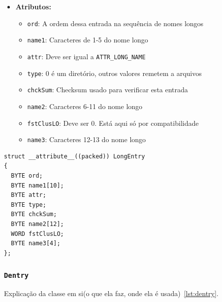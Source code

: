 \documentclass[
    12pt,				%
    oneside,   	        %
    a4paper,			%
    english,			%
    french,				%
    spanish,			%
    brazil,				%
    ]{pacotes/abntex2}
\begin{document}
\begin{itemize}
    \item \textbf{Atributos:}
        \begin{itemize}
            \item \texttt{ord}: A ordem dessa entrada na sequência de nomes longos
            \item \texttt{name1}: Caracteres de 1-5 do nome longo
            \item \texttt{attr}: Deve ser igual a \texttt{ATTR\_LONG\_NAME}
            \item \texttt{type}: 0 é um diretório, outros valores remetem a arquivos
            \item \texttt{chckSum}: Checksum usado para verificar esta entrada
            \item \texttt{name2}: Caracteres 6-11 do nome longo
            \item \texttt{fstClusLO}: Deve ser 0. Está aqui só por compatibilidade
            \item \texttt{name3}: Caracteres 12-13 do nome longo
        \end{itemize}
\end{itemize}


\begin{lstlisting}[caption={Estrutura que representa uma entrada longa no sistema de arquivos}, label={lst:longentry}] 
struct __attribute__((packed)) LongEntry
{
  BYTE ord;
  BYTE name1[10];
  BYTE attr; 
  BYTE type; 
  BYTE chckSum; 
  BYTE name2[12];
  WORD fstClusLO; 
  BYTE name3[4]; 
};
\end{lstlisting}

\subsubsection{\texttt{Dentry}}
\label{subsubsec:dentry}

Explicação da classe em si(o que ela faz, onde ela é usada)~\ref{lst:dentry}.
\end{document}
